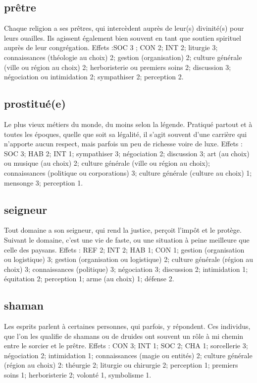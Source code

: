 \documentclass[10pt,a4paper,twocolumn]{book}
\begin{document}
\subsection*{prêtre}
Chaque religion a ses prêtres, qui intercèdent auprès de leur(s) divinité(s) pour leurs ouailles. Ils agissent également bien souvent en tant que soutien spirituel auprès de leur congrégation.
Effets :SOC 3 ; CON 2; INT 2; liturgie 3; connaissances (théologie au choix) 2; gestion (organisation) 2; culture générale (ville ou région au choix) 2; herboristerie ou premiers soins 2; discussion 3; négociation ou intimidation 2; sympathiser 2; perception 2.
\subsection*{prostitué(e)}
Le plus vieux métiers du monde, du moins selon la légende. Pratiqué partout et à toutes les époques, quelle que soit sa légalité, il s’agit souvent d’une carrière qui n’apporte aucun respect, mais parfois un peu de richesse voire de luxe. 
Effets : SOC 3; HAB 2; INT 1; sympathiser 3; négociation 2; discussion 3; art (au choix) ou musique (au choix) 2; culture générale (ville ou région au choix); connaissances (politique ou corporations) 3; culture générale (culture au choix) 1; mensonge 3; perception 1.
\subsection*{seigneur}
Tout domaine a son seigneur, qui rend la justice, perçoit l’impôt et le protège. Suivant le domaine, c’est une vie de faste, ou une situation à peine meilleure que celle des paysans.
Effets : REF 2; INT 2; HAB 1; CON 1; gestion (organisation ou logistique) 3; gestion (organisation ou logistique) 2; culture générale (région au choix) 3; connaissances (politique) 3; négociation 3; discussion 2; intimidation 1; équitation 2; perception 1; arme (au choix) 1; défense 2.
\subsection*{shaman}
Les esprits parlent à certaines personnes, qui parfois, y répondent. Ces individus, que l'on les qualifie de shamans ou de druides ont souvent un rôle à mi chemin entre le sorcier et le prêtre.
Effets : CON 3; INT 1; SOC 2; CHA 1; sorcellerie 3; négociation 2; intimidation 1; connaissances (magie ou entités) 2; culture générale (région au choix) 2: théurgie 2; liturgie ou chirurgie 2; perception 1; premiers soins 1; herboristerie 2; volonté 1, symbolisme 1.
\end{document}
